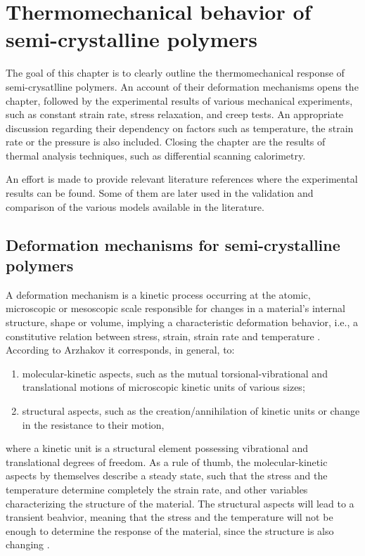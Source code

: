 \chapter{Thermomechanical behavior of semi-crystalline polymers} \label{ch:thermomechanical_behavior_semi_crystalline_polymer}

The goal of this chapter is to clearly outline the thermomechanical response of semi-crysatlline polymers.
An account of their deformation mechanisms opens the chapter, followed by the experimental results of various mechanical experiments, such as constant strain rate, stress relaxation, and creep tests.
An appropriate discussion regarding their dependency on factors such as temperature, the strain rate or the pressure is also included.
Closing the chapter are the results of thermal analysis techniques, such as differential scanning calorimetry.

An effort is made to provide relevant literature references where the experimental results can be found.
Some of them are later used in the validation and comparison of the various models available in the literature.

\section{Deformation mechanisms for semi-crystalline polymers}
A deformation mechanism is a kinetic process occurring at the atomic, microscopic or mesoscopic scale responsible for changes in a material's internal structure, shape or volume, implying a characteristic deformation behavior, i.e., a constitutive relation between stress, strain, strain rate and temperature \citep{frostDeformationmechanismMapsPlasticity1982}.
According to Arzhakov \citep{arzhakovRelaxationPhysicalMechanical2019}  it corresponds, in general, to:
\begin{enumerate}
	\item molecular-kinetic aspects, such as the mutual torsional-vibrational and translational motions of microscopic kinetic units of various sizes;
	\item structural aspects, such as the creation/annihilation of kinetic units or change in the resistance to their motion,
\end{enumerate}
where a kinetic unit is a structural element possessing vibrational and translational degrees of freedom.
As a rule of thumb, the molecular-kinetic aspects by themselves describe a steady state, such that the stress and the temperature determine completely the strain rate, and other variables characterizing the structure of the material.
The structural aspects will lead to a transient beahvior, meaning that the stress and the temperature will not be enough to determine the response of the material, since the structure is also changing \citep{frostDeformationmechanismMapsPlasticity1982}.

